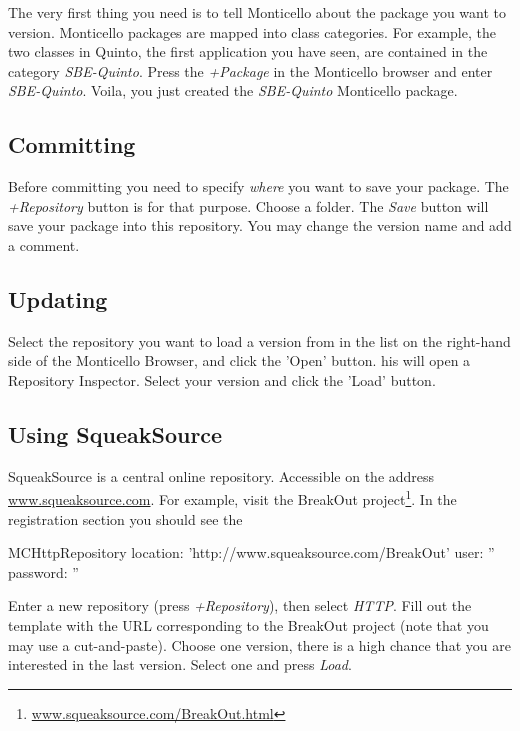 \documentclass[a4paper,10pt,twoside]{book}
\begin{document}
The very first thing you need is to tell Monticello about the package you want to version. Monticello packages are mapped into class categories. For example, the two classes in Quinto, the first application you have seen, are contained in the category \emph{SBE-Quinto}. Press the \emph{+Package} in the Monticello browser and enter \emph{SBE-Quinto}. Voila, you just created the \emph{SBE-Quinto} Monticello package. 

\subsection{Committing}

Before committing you need to specify \emph{where} you want to save your package. The \emph{+Repository} button is for that purpose. Choose a folder. The \emph{Save} button will save your package into this repository. You may change the version name and add a comment. 

\subsection{Updating}

Select the repository you want to load a version from in the list on the right-hand side of the Monticello Browser, and click the 'Open' button. his will open a Repository Inspector. Select your version and click the 'Load' button.

\subsection{Using SqueakSource}

SqueakSource is a central online repository. Accessible on the address \href{http://www.squeaksource.com}{www.squeaksource.com}. For example, visit the BreakOut project\footnote{\href{http://www.squeaksource.com/BreakOut.html}{www.squeaksource.com/BreakOut.html}}. In the registration section you should see the 

\begin{code}

MCHttpRepository
    location: 'http://www.squeaksource.com/BreakOut'
    user: ''
    password: ''
\end{code}

Enter a new repository (press \emph{+Repository}), then select \emph{HTTP}. Fill out the template with the URL corresponding to the BreakOut project (note that you may use a cut-and-paste). Choose one version, there is a high chance that you are interested in the last version. Select one and press \emph{Load}.
\end{document}

